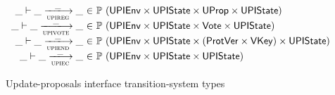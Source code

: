 \begin{figure}[htb]
\begin{equation*}
\begin{array}{r@{~\in~}l}
      \_ \vdash \_ \trans{upireg}{\_} \_ &
      \powerset (\UPIEnv \times \UPIState \times \UProp \times \UPIState)\\
      \_ \vdash \_ \trans{upivote}{\_} \_ &
      \powerset (\UPIEnv \times \UPIState \times \Vote \times \UPIState)\\
      \_ \vdash \_ \trans{upiend}{\_} \_ &
      \powerset (\UPIEnv \times \UPIState
      \times (\ProtVer \times \VKey) \times \UPIState)\\
      \_ \vdash \_ \trans{upiec}{\_} \_ &
      \powerset (\UPIEnv \times \UPIState \times \UPIState)
    \end{array}
  \end{equation*}
  \caption{Update-proposals interface transition-system types}
  \label{fig:ts-types:upi}
\end{figure}

